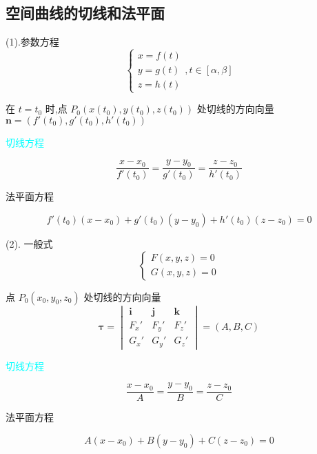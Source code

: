 \subsection{空间曲线的切线和法平面}
\begin{definition}[曲线切线和法平面]
	
	(1).参数方程
	$$\begin{cases}
		x = f(t)\\
		y = g(t)\\
		z = h(t)
	\end{cases}, t \in [\alpha,\beta]$$
	
	在 $t=t_{0}$ 时,点 $P_{0}(x(t_{0}),y(t_{0}),z(t_{0}))$ 处切线的方向向量 $\boldsymbol{n}=(f'(t_{0}),g'(t_{0}),h'(t_{0}))$
	
	\textcolor{cyan}{切线方程}
	
	$$\dfrac{x-x_{0}}{f'(t_{0})}=\dfrac{y-y_{0}}{g'(t_{0})}=\dfrac{z-z_{0}}{h'(t_{0})}$$
	
	\textcolor{purplea}{法平面方程}
	
	$$f'(t_{0})(x-x_{0})+g'(t_{0})(y-y_{0})+h'(t_{0})(z-z_{0})=0$$
	
	(2). 一般式
	$$\begin{cases}
		F(x,y,z) = 0\\
		G(x,y,z) = 0
	\end{cases}$$
	
	点 $P_{0}(x_{0},y_{0},z_{0})$ 处切线的方向向量
	$$\boldsymbol{\tau} = 
	\begin{vmatrix}
	  \boldsymbol{i} & \boldsymbol{j} & \boldsymbol{k}\\
	  F_{x}' & F_{y}' & F_{z}'\\
	  G_{x}' & G_{y}' & G_{z}'
	\end{vmatrix} = (A,B,C)$$

	
	\textcolor{cyan}{切线方程}
	
	$$\dfrac{x-x_{0}}{A} = \dfrac{y-y_{0}}{B} = \dfrac{z-z_{0}}{C}$$
	
	\textcolor{purplea}{法平面方程}
	
	$$A(x-x_{0}) + B(y-y_{0}) + C(z-z_{0}) = 0$$
	
	
\end{definition}

